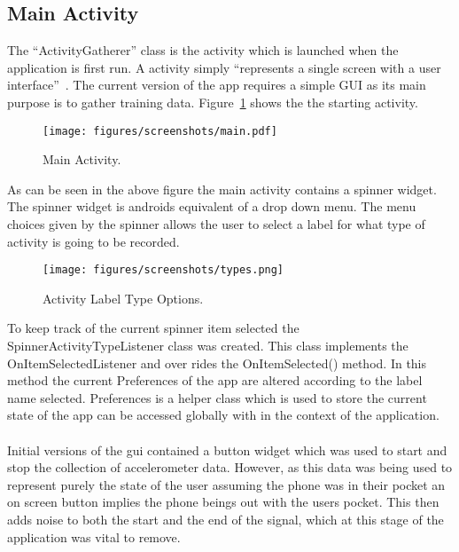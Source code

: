 \subsection{Main Activity} %
\label{sub:subsection_mainactivity}
The ``ActivityGatherer'' class is the activity which is launched when the application is first run. A activity simply ``represents a single screen with a user interface''~\cite{android2013fundamentals}. The current version of the app requires a simple GUI as its main purpose is to gather training data. Figure~\ref{fig:main-activity} shows the the starting activity.
\begin{figure}[h]
  \texttt{[image: figures/screenshots/main.pdf]}
  \caption{Main Activity.}
  \label{fig:main-activity}
\end{figure}
As can be seen in the above figure the main activity contains a spinner widget. The spinner widget is androids equivalent of a drop down menu. The menu choices given by the spinner allows the user to select a label for what type of activity is going to be recorded. 
\begin{figure}[h]
  \texttt{[image: figures/screenshots/types.png]}
  \caption{Activity Label Type Options.}
  \label{fig:type-choice}
\end{figure}
To keep track of the current spinner item selected the SpinnerActivityTypeListener class was created. This class implements the OnItemSelectedListener and over rides the OnItemSelected() method. In this method the current Preferences of the app are altered according to the label name selected. Preferences is a helper class which is used to store the current state of the app can be accessed globally with in the context of the application.
\paragraph{}
Initial versions of the gui contained a button widget which was used to start and stop the collection of accelerometer data. However, as this data was being used to represent purely the state of the user  assuming the phone was in their pocket an on screen button implies the phone beings out with the users pocket. This then adds noise to both the start and the end of the signal, which at this stage of the application was vital to remove. 
